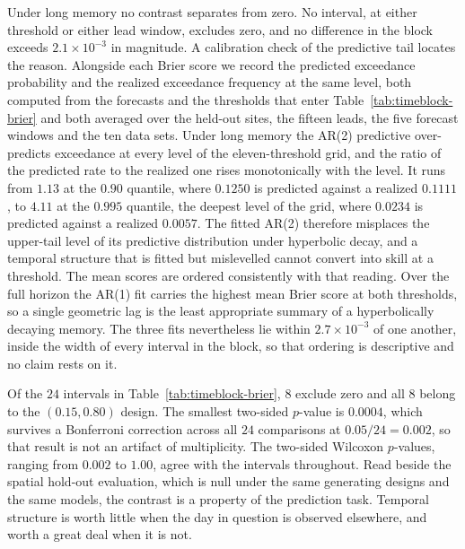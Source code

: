 \documentclass[12pt]{article}
\begin{document}
Under long memory no contrast separates from zero.  No interval, at either threshold or either lead window, excludes zero, and no difference in the block exceeds $2.1 \times 10^{-3}$ in magnitude.  A calibration check of the predictive tail locates the reason.  Alongside each Brier score we record the predicted exceedance probability and the realized exceedance frequency at the same level, both computed from the forecasts and the thresholds that enter Table~\ref{tab:timeblock-brier} and both averaged over the held-out sites, the fifteen leads, the five forecast windows and the ten data sets.  Under long memory the AR(2) predictive over-predicts exceedance at every level of the eleven-threshold grid, and the ratio of the predicted rate to the realized one rises monotonically with the level.  It runs from $1.13$ at the $0.90$ quantile, where $0.1250$ is predicted against a realized $0.1111$, to $4.11$ at the $0.995$ quantile, the deepest level of the grid, where $0.0234$ is predicted against a realized $0.0057$.  The fitted AR(2) therefore misplaces the upper-tail level of its predictive distribution under hyperbolic decay, and a temporal structure that is fitted but mislevelled cannot convert into skill at a threshold.  The mean scores are ordered consistently with that reading.  Over the full horizon the AR(1) fit carries the highest mean Brier score at both thresholds, so a single geometric lag is the least appropriate summary of a hyperbolically decaying memory.  The three fits nevertheless lie within $2.7 \times 10^{-3}$ of one another, inside the width of every interval in the block, so that ordering is descriptive and no claim rests on it.

Of the $24$ intervals in Table~\ref{tab:timeblock-brier}, $8$ exclude zero and all $8$ belong to the $(0.15, 0.80)$ design.  The smallest two-sided $p$-value is $0.0004$, which survives a Bonferroni correction across all $24$ comparisons at $0.05/24 = 0.002$, so that result is not an artifact of multiplicity.  The two-sided Wilcoxon $p$-values, ranging from $0.002$ to $1.00$, agree with the intervals throughout.  Read beside the spatial hold-out evaluation, which is null under the same generating designs and the same models, the contrast is a property of the prediction task.  Temporal structure is worth little when the day in question is observed elsewhere, and worth a great deal when it is not.
\end{document}
